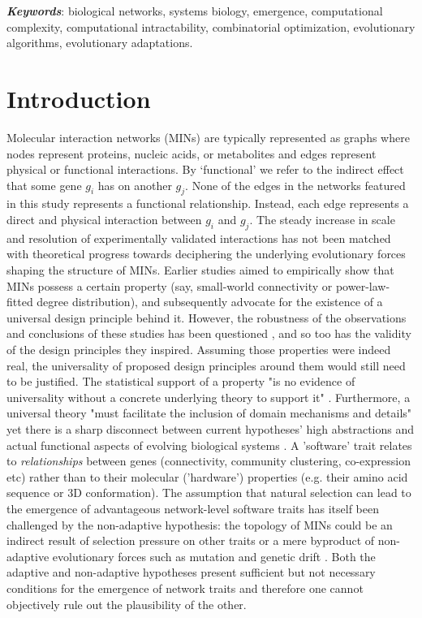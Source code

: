 \documentclass[12pt]{article}
\begin{document}
\vspace{15pt}
\noindent\textit{\textbf{Keywords}}: biological networks, systems biology, emergence, computational complexity, computational intractability, combinatorial optimization, evolutionary algorithms, evolutionary adaptations.


\section{Introduction}
Molecular interaction networks (MINs) are typically represented as graphs where nodes represent proteins, nucleic acids, or metabolites and edges represent physical or functional interactions. By `functional' we refer to the indirect effect that some gene $g_i$ has on another $g_j$. None of the edges in the networks featured in this study represents a functional relationship. Instead, each edge represents a direct and physical interaction between  $g_i$ and  $g_j$. The steady increase in scale \cite{rolland_proteome-scale_2014} and resolution \cite{yang_widespread_2016} of experimentally validated interactions has not been matched with theoretical progress towards deciphering the underlying evolutionary forces shaping the structure of MINs. Earlier studies aimed to empirically show that MINs possess a certain property (say, small-world connectivity or power-law-fitted degree distribution), and subsequently advocate for the existence of a universal design principle behind it. However, the robustness of the observations and conclusions of these studies \cite{barabasi_emergence_1999, fell_small_2000} has been questioned \cite{arita_metabolic_2004, tanaka_protein_2005, fox_keller_revisiting_2005, khanin_how_2006}, and so too \cite{stelling_robustness_2004, hahn_molecular_2004} has the validity of the design principles \cite{albert_error_2000, barabasi_network_2004} they inspired. Assuming those properties were indeed real, the universality of proposed design principles around them would still need to be justified. The statistical support of a property "is no evidence of universality without a concrete underlying theory to support it" \cite{stumpf_critical_2012}. Furthermore, a universal theory "must facilitate the inclusion of domain mechanisms and details" yet there is a sharp disconnect between current hypotheses' high abstractions and actual functional aspects of evolving biological systems \cite{alderson_contrasting_2010}. A 'software' trait relates to \textit{relationships} between genes (connectivity, community clustering, co-expression etc) rather than to their molecular ('hardware') properties (e.g. their amino acid sequence or 3D conformation). The assumption that natural selection can lead to the emergence of advantageous network-level software traits has itself been challenged by the non-adaptive hypothesis: the topology of MINs could be an indirect result of selection pressure on other traits \cite{papp_critical_2009} or a mere byproduct of non-adaptive evolutionary forces such as mutation and genetic drift \cite{lynch_evolution_2007, sorrells_making_2015}. Both the adaptive and non-adaptive hypotheses present sufficient but not necessary conditions for the emergence of network traits and therefore one cannot objectively rule out the plausibility of the other.
\end{document}
